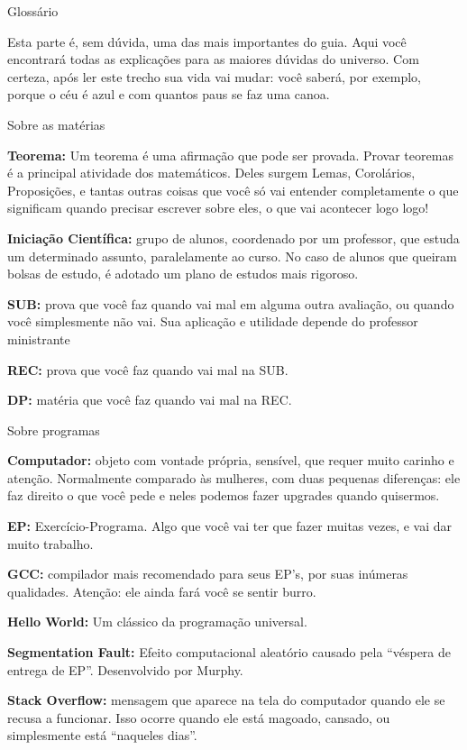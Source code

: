 \begin{secao}{Glossário}

Esta parte é, sem dúvida, uma das mais importantes do guia. Aqui você
encontrará todas as explicações para as maiores dúvidas do universo. Com
certeza, após ler este trecho sua vida vai mudar: você saberá, por exemplo,
porque o céu é azul e com quantos paus se faz uma canoa.

\begin{subsecao}{Sobre as matérias}

{\bf Teorema:} Um teorema é uma afirmação que pode ser provada. Provar
teoremas é a principal atividade dos matemáticos. Deles surgem Lemas,
Corolários, Proposições, e tantas outras coisas que você só vai entender
completamente o que significam quando precisar escrever sobre eles, o que vai
acontecer logo logo!

{\bf Iniciação Científica:} grupo de alunos, coordenado por um professor, que
estuda um determinado assunto, paralelamente ao curso. No caso de alunos que
queiram bolsas de estudo, é adotado um plano de estudos mais rigoroso.

{\bf SUB:} prova que você faz quando vai mal em alguma outra avaliação, ou
quando você simplesmente não vai. Sua aplicação e utilidade depende do
professor ministrante

{\bf REC:} prova que você faz quando vai mal na SUB.

{\bf DP:} matéria que você faz quando vai mal na REC.
\end{subsecao}

\begin{subsecao}{Sobre programas}

{\bf Computador:} objeto com vontade própria, sensível, que requer muito
carinho e atenção. Normalmente comparado às mulheres, com duas pequenas
diferenças: ele faz direito o que você pede e neles podemos fazer upgrades
quando quisermos.

{\bf EP:} Exercício-Programa. Algo que você vai ter que fazer muitas vezes, e
vai dar muito trabalho.

{\bf GCC:} compilador mais recomendado para seus EP's, por suas inúmeras
qualidades. Atenção: ele ainda fará você se sentir burro.

{\bf Hello World:} Um clássico da programação universal.

{\bf Segmentation Fault:} Efeito computacional aleatório causado pela ``véspera
de entrega de EP''. Desenvolvido por Murphy.

{\bf Stack Overflow:} mensagem que aparece na tela do computador
quando ele se recusa a funcionar. Isso ocorre quando ele está magoado, cansado,
ou simplesmente está ``naqueles dias''.


\end{subsecao}
\end{secao}
